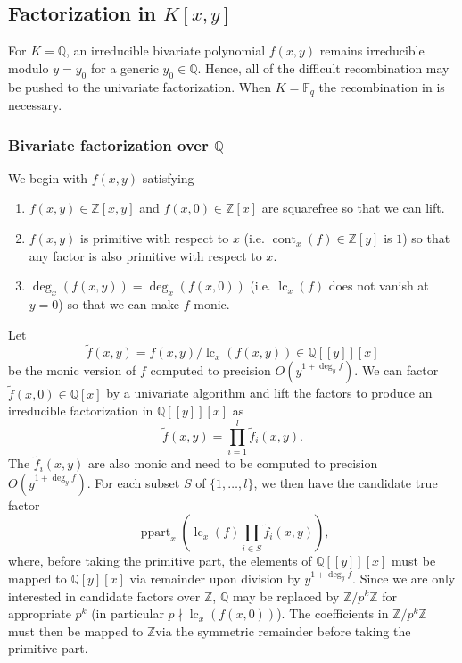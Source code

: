 \documentclass[11pt,reqno]{amsart}
\numberwithin{equation}{section}
\newcommand{\op}[1]  { \operatorname{ #1 }}
\begin{document}
\subsection{Factorization in $K[x,y]$}
For $K=\mathbb{Q}$, an irreducible bivariate polynomial $f(x,y)$ remains
irreducible modulo $y=y_0$ for a generic $y_0 \in \mathbb{Q}$. Hence, all of
the difficult recombination may be pushed to the univariate factorization. When
$K=\mathbb{F}_q$ the recombination in \cite{GlobalFactor} is necessary.
\subsubsection{Bivariate factorization over $\mathbb{Q}$}
We begin with $f(x,y)$ satisfying
\begin{enumerate}
\item $f(x,y) \in \mathbb{Z}[x,y]$ and $f(x,0) \in \mathbb{Z}[x]$ are
squarefree so that we can lift.
\item $f(x,y)$ is primitive with respect to $x$ (i.e.
$\op{cont}_x(f) \in \mathbb{Z}[y]$ is $1$) so that any factor is also primitive
with respect to $x$.
\item $\op{deg}_x (f(x,y)) = \op{deg}_x (f(x,0))$ (i.e. $\op{lc}_x(f)$ does not
vanish at $y=0$) so that we can make $f$ monic.
\end{enumerate}
Let
\begin{equation*}
\tilde{f}(x,y) = f(x,y) / \op{lc}_x (f(x,y)) \in \mathbb{Q}[[y]][x]
\end{equation*}
be the monic version of $f$ computed to precision $O(y^{1 + \op{deg}_y f})$.
We can factor $\tilde{f}(x,0) \in \mathbb{Q}[x]$ by a univariate algorithm and 
lift the factors to produce an irreducible factorization in
$\mathbb{Q}[[y]][x]$ as
\begin{equation*}
\tilde{f}(x,y) = \prod_{i=1}^{l} \tilde{f}_i(x,y)\text{.}
\end{equation*}
The $\tilde{f}_i(x,y)$ are also monic and need to be computed to precision
$O(y^{1 + \op{deg}_y f})$. For each subset $S$ of $\{1,\dots, l\}$, we then
have the candidate true factor
\begin{equation*}
\op{ppart}_x \left(\op{lc}_x(f) \prod_{i \in S} \tilde{f}_i(x,y) \right)\text{,}
\end{equation*}
where, before taking the primitive part, the elements of $\mathbb{Q}[[y]][x]$
must be mapped to $\mathbb{Q}[y][x]$ via remainder upon division by
$y^{1 + \op{deg}_y f}$. Since we are only interested in candidate factors over 
$\mathbb{Z}$, $\mathbb{Q}$ may be replaced by $\mathbb{Z}/p^k \mathbb{Z}$ for
appropriate $p^k$ (in particular $p \nmid \op{lc}_x (f(x,0))$). The
coefficients in $\mathbb{Z}/p^k \mathbb{Z}$ must then be mapped to $\mathbb{Z}$via the symmetric remainder before taking the primitive part.
\end{document}
